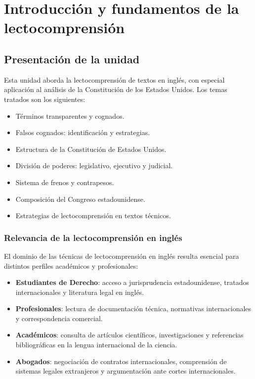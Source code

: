 \documentclass[12pt,oneside]{book}
\begin{document}
\chapter{Introducción y fundamentos de la lectocomprensión}

\section{Presentación de la unidad}

Esta unidad aborda la lectocomprensión de textos en inglés, con especial aplicación al análisis de la Constitución de los Estados Unidos. Los temas tratados son los siguientes:

\begin{itemize}
    \item Términos transparentes y cognados.
    \item Falsos cognados: identificación y estrategias.
    \item Estructura de la Constitución de Estados Unidos.
    \item División de poderes: legislativo, ejecutivo y judicial.
    \item Sistema de frenos y contrapesos.
    \item Composición del Congreso estadounidense.
    \item Estrategias de lectocomprensión en textos técnicos.
\end{itemize}

\subsection{Relevancia de la lectocomprensión en inglés}

El dominio de las técnicas de lectocomprensión en inglés resulta esencial para distintos perfiles académicos y profesionales:

\begin{itemize}
    \item \textbf{Estudiantes de Derecho}: acceso a jurisprudencia estadounidense, tratados internacionales y literatura legal en inglés.
    \item \textbf{Profesionales}: lectura de documentación técnica, normativas internacionales y correspondencia comercial.
    \item \textbf{Académicos}: consulta de artículos científicos, investigaciones y referencias bibliográficas en la lengua internacional de la ciencia.
    \item \textbf{Abogados}: negociación de contratos internacionales, comprensión de sistemas legales extranjeros y argumentación ante cortes internacionales.
\end{itemize}
\end{document}
